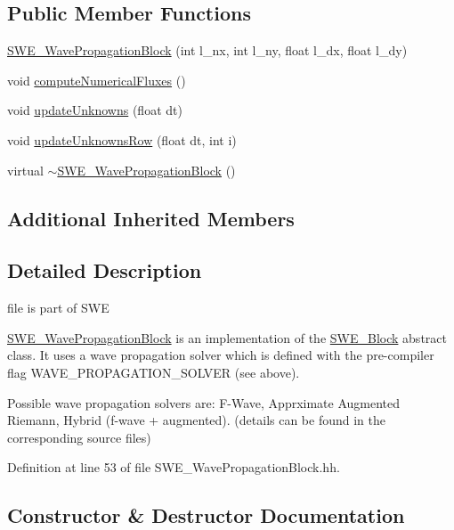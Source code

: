 \subsection*{Public Member Functions}
\begin{DoxyCompactItemize}
\item 
\hyperlink{classSWE__WavePropagationBlock_a9727e083d56a6d7aa9910f50c43080a9}{S\+W\+E\+\_\+\+Wave\+Propagation\+Block} (int l\+\_\+nx, int l\+\_\+ny, float l\+\_\+dx, float l\+\_\+dy)
\item 
void \hyperlink{classSWE__WavePropagationBlock_a5f6335a38fb3cf38623326959f06baf4}{compute\+Numerical\+Fluxes} ()
\item 
void \hyperlink{classSWE__WavePropagationBlock_a1b1422472a36602b34180e4ed27f6d8c}{update\+Unknowns} (float dt)
\item 
void \hyperlink{classSWE__WavePropagationBlock_ad7c91177190b9d131387998d16fa7df6}{update\+Unknowns\+Row} (float dt, int i)
\item 
virtual \hyperlink{classSWE__WavePropagationBlock_a9e53f3eaa7aee547ef88233069ff0667}{$\sim$\+S\+W\+E\+\_\+\+Wave\+Propagation\+Block} ()
\end{DoxyCompactItemize}
\subsection*{Additional Inherited Members}


\subsection{Detailed Description}
file is part of S\+WE 

\hyperlink{classSWE__WavePropagationBlock}{S\+W\+E\+\_\+\+Wave\+Propagation\+Block} is an implementation of the \hyperlink{classSWE__Block}{S\+W\+E\+\_\+\+Block} abstract class. It uses a wave propagation solver which is defined with the pre-\/compiler flag W\+A\+V\+E\+\_\+\+P\+R\+O\+P\+A\+G\+A\+T\+I\+O\+N\+\_\+\+S\+O\+L\+V\+ER (see above).

Possible wave propagation solvers are\+: F-\/\+Wave, Apprximate Augmented Riemann, Hybrid (f-\/wave + augmented). (details can be found in the corresponding source files) 

Definition at line 53 of file S\+W\+E\+\_\+\+Wave\+Propagation\+Block.\+hh.



\subsection{Constructor \& Destructor Documentation}
